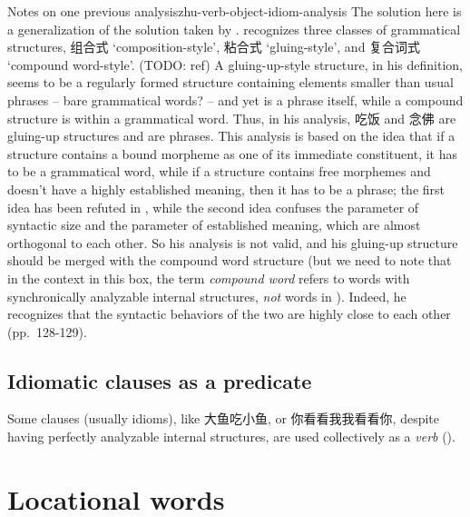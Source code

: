 \documentclass[UTF8, a4paper, oneside, scheme=plain]{ctexrep}
\newcommand*{\citesec}[1]{\S~{#1}}
\newcommand*{\citepages}[1]{pp.~{#1}}
\newcommand*{\term}[1]{\emph{#1}}
\newcommand{\translate}[1]{`#1'}
\begin{document}
\begin{infobox}{Notes on one previous analysis}{zhu-verb-object-idiom-analysis}
    The solution here is a generalization of 
    the solution taken by \citet[\citesec{1.2.6}]{zhudexigrammar}.
    \citet{zhudexigrammar} recognizes three classes of grammatical structures, 
    组合式 \translate{composition-style}, 粘合式 \translate{gluing-style}, 
    and 复合词式 \translate{compound word-style}.
    (TODO: ref) 
    A gluing-up-style structure, in his definition, 
    seems to be a regularly formed structure 
    containing elements smaller than usual phrases 
    -- bare grammatical words? --
    and yet is a phrase itself,
    while a compound structure is within a grammatical word.
    Thus, in his analysis, 
    吃饭 and 念佛 are gluing-up structures 
    and are phrases. 
    This analysis is based on the idea that 
    if a structure contains a bound morpheme as one of its immediate constituent, 
    it has to be a grammatical word, 
    while if a structure contains free morphemes 
    and doesn't have a highly established meaning, 
    then it has to be a phrase; 
    the first idea has been refuted in , 
    while the second idea confuses 
    the parameter of syntactic size 
    and the parameter of established meaning, 
    which are almost orthogonal to each other. 
    So his analysis is not valid, 
    and his gluing-up structure should be merged with 
    the compound word structure
    (but we need to note that in the context in this box, 
    the term \term{compound word}
    refers to words with synchronically analyzable internal structures, 
    \emph{not} words in ).
    Indeed, he recognizes that the syntactic behaviors of the two are highly close to each other 
    (\citepages{128-129}).
\end{infobox}

\subsection{Idiomatic clauses as a predicate}

Some clauses (usually idioms), like 大鱼吃小鱼, or 你看看我我看看你,
despite having perfectly analyzable internal structures, 
are used collectively as a \emph{verb} ().

\section{Locational words}\label{sec:pos.locational}
\end{document}
